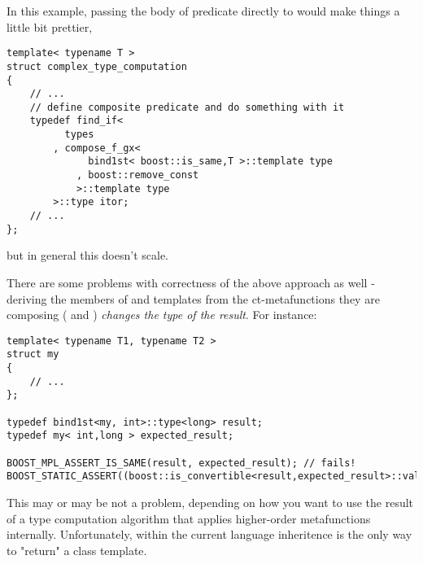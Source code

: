 \documentclass{netobjectdays}
\begin{document}

In this example, passing the body of 
 predicate directly to 
 would make things a little bit prettier, 


{\footnotesize
\begin{verbatim}
template< typename T >
struct complex_type_computation
{
    // ...
    // define composite predicate and do something with it
    typedef find_if<
          types
        , compose_f_gx<
              bind1st< boost::is_same,T >::template type
            , boost::remove_const
            >::template type
        >::type itor;
    // ...
};
\end{verbatim}
}

but in general this doesn't scale. 

There are some problems with correctness of the above 
approach as well - deriving the  members of 
 and  templates from 
the ct-metafunctions they are composing ( and 
) \emph{changes the type of the result}. 
For instance:

{\footnotesize
\begin{verbatim}
template< typename T1, typename T2 >
struct my
{
    // ...
};

typedef bind1st<my, int>::type<long> result;
typedef my< int,long > expected_result;

BOOST_MPL_ASSERT_IS_SAME(result, expected_result); // fails!
BOOST_STATIC_ASSERT((boost::is_convertible<result,expected_result>::value));
\end{verbatim}
}

This may or may be not a problem, depending on how you 
want to use the result of a type computation algorithm 
that applies higher-order metafunctions internally. 
Unfortunately, within the current language inheritence 
is the only way to "return" a class template.


\emph{MORE IMPORTANLY - why representing metafunctions as plain class
templates (ct-metafunctions) is not a option.}
\end{document}
